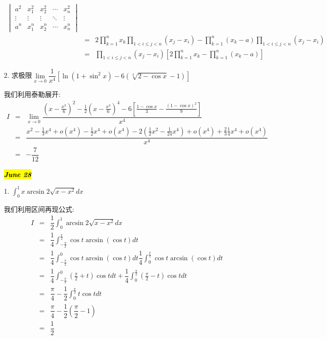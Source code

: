 \begin{solution}
\begin{eqnarray*}
\begin{vmatrix}
			a^2    & x_{1}^2 & x_{2}^2 & \cdots & x_{n}^2\\
			\vdots & \vdots  & \vdots  & \ddots & \vdots\\
			a^n    & x_{1}^n & x_{2}^n & \cdots & x_{n}^n
		\end{vmatrix}\\
		    & = & 2\prod\limits_{k=1}^{n}x_{k}\prod\limits_{1<i\leq j<n}(x_{j}-x_{i})-\prod\limits_{k=1}^{n}(x_{k}-a)\prod\limits_{1<i\leq j<n}(x_{j}-x_{i})\\
		    & = & \prod\limits_{1<i\leq j<n}(x_{j}-x_{i})\left[ 2\prod\limits_{k=1}^{n}x_{k}-\prod\limits_{k=1}^{n}(x_{k}-a)\right] 
	\end{eqnarray*}
\end{solution}

2. 求极限$\lim\limits_{x\rightarrow 0}\dfrac{1}{x^4}\left[ \ln(1+\sin^2 x)-6(\sqrt[3]{2-\cos x}-1)\right] $
\begin{solution}
	
	我们利用泰勒展开: 
	\begin{eqnarray*}
		I&=&\lim\limits_{x\rightarrow 0}\dfrac{(x-\frac{x^3}{6})^2-\frac{1}{2}(x-\frac{x^3}{6})^4-6[\frac{1-\cos x}{3}-\frac{(1-\cos x)^2}{9}]}{x^4}\\
		&=&\dfrac{x^2-\frac{1}{3}x^4+o(x^4)-\frac{1}{2}x^4+o(x^4)-2(\frac{1}{2}x^2-\frac{1}{24}x^4)+o(x^4)+\frac{2}{3}\frac{1}{4}x^4+o(x^4)}{x^4}\\
		&=&-\dfrac{7}{12}
	\end{eqnarray*}
\end{solution}

\hl{\textbf{\textit{June 28}}}

1. $\int_{0}^{1}x\arcsin 2\sqrt{x-x^2}dx$
\begin{solution}
	
	我们利用区间再现公式: 
	\begin{eqnarray*}
		I&=&\dfrac{1}{2}\int_{0}^{1}\arcsin2\sqrt{x-x^2}dx\\
		&=&\dfrac{1}{4}\int_{-\frac{\pi}{2}}^{\frac{\pi}{2}}\cos t\arcsin (\cos t)dt\\
		&=&\dfrac{1}{4}\int_{-\frac{\pi}{2}}^{0}\cos t\arcsin (\cos t)dt\dfrac{1}{4}\int_{0}^{\frac{\pi}{2}}\cos t\arcsin (\cos t)dt\\
		&=&\dfrac{1}{4}\int_{-\frac{\pi}{2}}^{0}(\frac{\pi}{2}+t)\cos tdt+\dfrac{1}{4}\int_{0}^{\frac{\pi}{2}}(\frac{\pi}{2}-t)\cos tdt\\
		&=&\dfrac{\pi}{4}-\dfrac{1}{2}\int_{0}^{\frac{\pi}{2}}t\cos tdt\\
		&=&\dfrac{\pi}{4}-\dfrac{1}{2}(\dfrac{\pi}{2}-1)\\
		&=&\dfrac{1}{2}
	\end{eqnarray*}
	
	
\end{solution}

